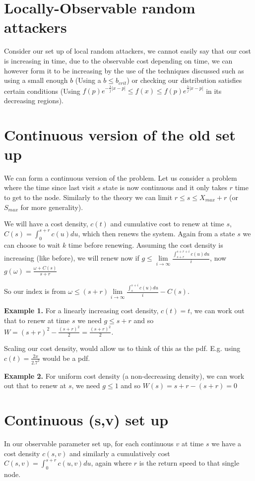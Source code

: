 \documentclass[a4paper,10pt]{article}
\theoremstyle{definition}
\theoremstyle{definition}
\theoremstyle{remark}
\theoremstyle{definition}
\begin{document}
\section{Locally-Observable random attackers}
  
Consider our set up of local random attackers, we cannot easily say that our cost is increasing in time, due to the observable cost depending on time, we can however form it to be increasing by the use of the techniques discussed such as using a small enough $b$ (Using a $b \leq b_{crit}$) or checking our distribution satisfies certain conditions (Using $f(p)e^{-\frac{\lambda}{j}|x-p|} \leq f(x) \leq f(p)e^{\frac{\lambda}{j}|x-p|}$ in its decreasing regions).  
    
  
\section{Continuous version of the old set up}

We can form a continuous version of the problem. Let us consider a problem where the time since last visit $s$ state is now continuous and it only takes $r$ time to get to the node. Similarly to the theory we can limit $r \leq s \leq X_{max}+r$ (or $S_{max}$ for more generality).

We will have a cost density, $c(t)$ and cumulative cost to renew at time $s$, $C(s)= \int_{0}^{s+r} c(u) du$, which then renews the system. Again from a state $s$ we can choose to wait $k$ time before renewing. Assuming the cost density is increasing (like before), we will renew now if $g \leq \lim\limits_{i \rightarrow \infty} \frac{\int_{s+r}^{s+r+i} c(u) du}{i}$, now $g(\omega)=\frac{\omega + C(s)}{s+r}$  

So our index is from $\omega \leq (s+r) \lim\limits_{i \rightarrow \infty} \frac{\int_{s}^{s+i} c(u) du}{i} -C(s)$.

\textbf{Example 1.}
For a linearly increasing cost density, $c(t)=t$, we can work out that to renew at time $s$ we need $g \leq s+r$ and so$W=(s+r)^2 - \frac{(s+r)^2}{2}=\frac{(s+r)^2}{2}$.


Scaling our cost density, would allow us to think of this as the pdf. E.g. using $c(t)=\frac{2 x}{2.7^2}$ would be a pdf.

\textbf{Example 2.}
For uniform cost density (a non-decreasing density), we can work out that to renew at $s$, we need $g \leq 1$ and so $W(s)=s+r-(s+r)=0$


\section{Continuous (s,v) set up}
In our observable parameter set up, for each continuous $v$ at time $s$ we have a cost density $c(s,v)$ and similarly a cumulatively cost $C(s,v)=\int_{0}^{s+r} c(u,v) du$, again where $r$ is the return speed to that single node.
\end{document}
